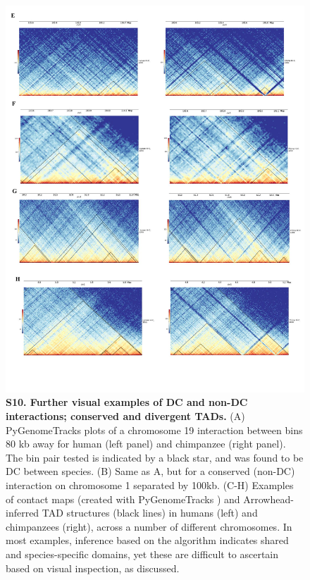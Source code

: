 \begin{figure}[!htb]
\includegraphics[width=6in]{img/figS10.2.pdf}
\caption[Further visual examples of DC and non-DC interactions; conserved and divergent TADs.]{\textbf{S10. Further visual examples of DC and non-DC interactions; conserved and divergent TADs.} (A) PyGenomeTracks plots \cite{Ramirez.2018} of a chromosome 19 interaction between bins 80 kb away for human (left panel) and chimpanzee (right panel). The bin pair tested is indicated by a black star, and was found to be DC between species. (B) Same as A, but for a conserved (non-DC) interaction on chromosome 1 separated by 100kb. (C-H) Examples of contact maps (created with PyGenomeTracks \cite{Ramirez.2018}) and Arrowhead-inferred TAD structures (black lines) in humans (left) and chimpanzees (right), across a number of different chromosomes. In most examples, inference based on the algorithm indicates shared and species-specific domains, yet these are difficult to ascertain based on visual inspection, as discussed.}
\label{fig:ch02-figS10}
\end{figure}

